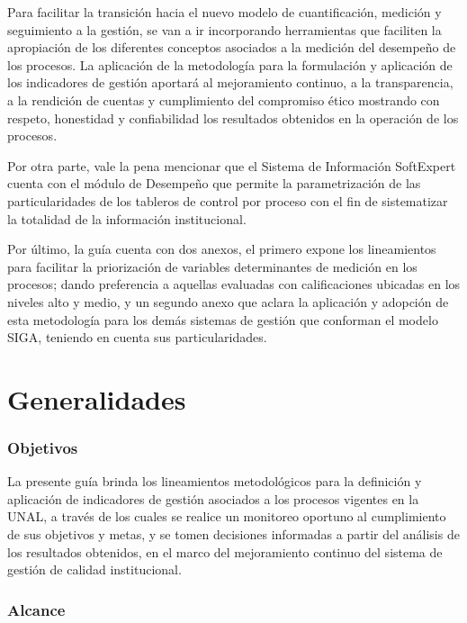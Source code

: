 \documentclass[
]{book}
\begin{document}
Para facilitar la transición hacia el nuevo modelo de cuantificación, medición y seguimiento a la gestión, se van a ir incorporando herramientas que faciliten la apropiación de los diferentes conceptos asociados a la medición del desempeño de los procesos. La aplicación de la metodología para la formulación y aplicación de los
indicadores de gestión aportará al mejoramiento continuo, a la transparencia, a la rendición de cuentas y cumplimiento del compromiso ético mostrando con respeto, honestidad y confiabilidad los resultados obtenidos
en la operación de los procesos.

Por otra parte, vale la pena mencionar que el Sistema de Información SoftExpert cuenta con el módulo de
Desempeño que permite la parametrización de las particularidades de los tableros de control por proceso con el fin de sistematizar la totalidad de la información institucional.

Por último, la guía cuenta con dos anexos, el primero expone los lineamientos para facilitar la priorización de
variables determinantes de medición en los procesos; dando preferencia a aquellas evaluadas con calificaciones
ubicadas en los niveles alto y medio, y un segundo anexo que aclara la aplicación y adopción de esta
metodología para los demás sistemas de gestión que conforman el modelo SIGA, teniendo en cuenta sus
particularidades.

\hypertarget{generalidades}{%
\chapter{Generalidades}\label{generalidades}}

\hypertarget{objetivos}{%
\subsection{Objetivos}\label{objetivos}}

La presente guía brinda los lineamientos metodológicos para la definición y aplicación de indicadores de gestión
asociados a los procesos vigentes en la UNAL, a través de los cuales se realice un monitoreo oportuno al
cumplimiento de sus objetivos y metas, y se tomen decisiones informadas a partir del análisis de los resultados obtenidos, en el marco del mejoramiento continuo del sistema de gestión de calidad institucional.

\hypertarget{alcance}{%
\subsection{Alcance}\label{alcance}}
\end{document}
